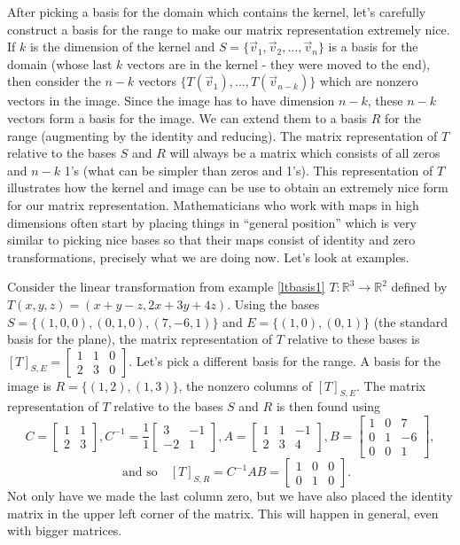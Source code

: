 After picking a basis for the domain which contains the kernel, let's carefully construct a basis for the range to make our matrix representation extremely nice.  
If $k$ is the dimension of the kernel and $S=\{\vec v_1,\vec v_2,\ldots,\vec v_n\}$ is a basis for the domain (whose last $k$ vectors are in the kernel - they were moved to the end), then consider the $n-k$ vectors $\{T(\vec v_{1}),\ldots,T(\vec v_{n-k})\}$ which are nonzero vectors in the image.  Since the image has to have dimension $n-k$, these $n-k$ vectors form a basis for the image. We can extend them to a basis $R$ for the range (augmenting by the identity and reducing). The matrix representation of $T$ relative to the bases $S$ and $R$ will always be a matrix which consists of all zeros and $n-k$ 1's (what can be simpler than zeros and 1's).  This representation of $T$ illustrates how the kernel and image can be use to obtain an extremely nice form for our matrix representation.  Mathematicians who work with maps in high dimensions often start by placing things in ``general position'' which is very similar to picking nice bases so that their maps consist of identity and zero transformations, precisely what we are doing now.  Let's look at examples.



\begin{example}
Consider the linear transformation from example \ref{ltbasis1} $T\colon{\mathbb{R}}^3\to {\mathbb{R}}^2$ defined by $T(x,y,z)=(x+y-z,2x+3y+4z)$. Using the bases $S=\{(1,0,0),(0,1,0),(7,-6,1)\}$ and $E=\{(1,0),(0,1)\}$ (the standard basis for the plane), the matrix representation of $T$ relative to these bases is  
$[T]_{S,E} = \begin{bmatrix}
 1 & 1 &0\\
 2 & 3 &0
\end{bmatrix}$. 
Let's pick a different basis for the range.  A basis for the image is $R = \{(1,2),(1,3)\}$, the nonzero columns of $[T]_{S,E}$. 
The matrix representation of $T$ relative to the bases $S$ and $R$ is then found using 
$$C=
\begin{bmatrix}
1 & 1\\
2 & 3
\end{bmatrix},
C^{-1} = 
\frac{1}{1}
\begin{bmatrix}
3 & -1\\
-2 & 1
\end{bmatrix},
A=
\begin{bmatrix}
 1 & 1 & -1 \\
 2 & 3 & 4
\end{bmatrix}, 
B=
\begin{bmatrix}
 1 & 0 &7\\
 0 & 1 &-6\\
 0 & 0 &1
\end{bmatrix},
$$
$$
\quad \text {and so} \quad 
[T]_{S,R} =C^{-1}AB= 
\begin{bmatrix}
 1 & 0 & 0 \\
 0 & 1 & 0
\end{bmatrix} .$$ 
Not only have we made the last column zero, but we have also placed the identity matrix in the upper left corner of the matrix. This will happen in general, even with bigger matrices.
\end{example}

